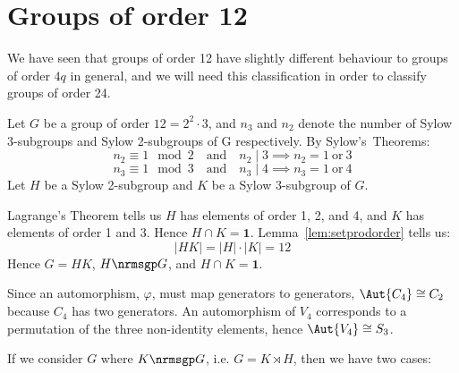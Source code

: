 \section{Groups of order 12}
We have seen that groups of order 12 have slightly different behaviour to groups of order \(4q\) in general, and we will
need this classification in order to classify groups of order 24.

Let \(G\) be a group of order \(12 = 2^2 \cdot 3\), and \(n_3\) and \(n_2\) denote the number of Sylow 3-subgroups and
Sylow 2-subgroups of G respectively.
By Sylow's~Theorems:
\[n_2 \equiv 1 \mod{2} \quad \text{and} \quad n_2 \mid 3 \implies n_2 = 1 \ \text{or} \ 3\]
\[n_3 \equiv 1 \mod{3} \quad \text{and} \quad n_3 \mid 4 \implies n_3 = 1 \ \text{or} \ 4\]
Let \(H\) be a Sylow 2-subgroup and \(K\) be a Sylow 3-subgroup of \(G\).

Lagrange's Theorem tells us \(H\) has elements of order 1, 2, and 4, and \(K\) has elements of order 1 and 3.
Hence \(H \cap K = \bm{1}\).
Lemma~\ref{lem:setprodorder} tells us:
\[|HK| = |H| \cdot |K| = 12\]
Hence \(G = HK\), \(H \nrmsgp G\), and \(H \cap K = \bm{1}\).

Since an automorphism, \(\varphi\), must map generators to generators, \(\Aut{C_4} \cong C_2\) because \(C_4\) has two
generators.
An automorphism of \(V_4\) corresponds to a permutation of the three
non-identity elements, hence \(\Aut{V_4} \cong S_3\).

If we consider \(G\) where \(K \nrmsgp G\), i.e. \(G = K \rtimes H\), then we have two cases:

